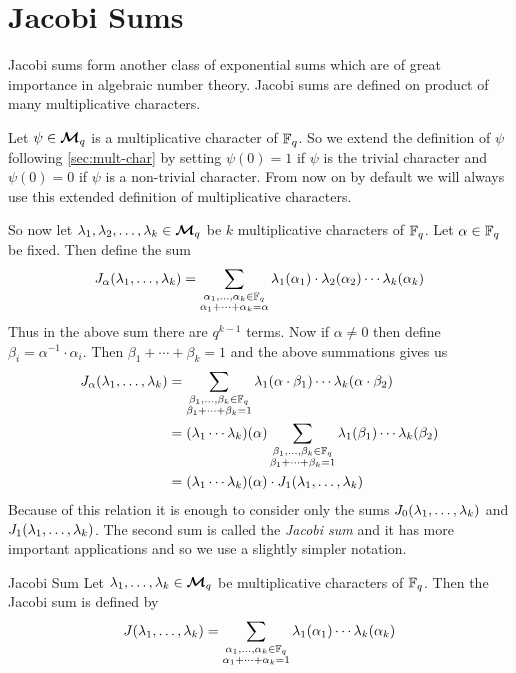 \section{Jacobi Sums}\label{sec:jacobi-sums}
%
Jacobi sums form another class of exponential sums which are of great importance in algebraic number theory. Jacobi sums are defined on product of many multiplicative characters. 

Let $\psi\in\boldsymbol{\mathcal{M}}_q$ is a multiplicative character of $\mathbb{F}_q$. So we extend the definition of $\psi$ following \autoref{sec:mult-char} by setting $\psi(0)=1$ if $\psi$ is the trivial character and $\psi(0)=0$ if $\psi$ is a non-trivial character. From now on by default we will always use this extended definition of multiplicative characters. 

So now let $\lambda_1,\lambda_2,\dots, \lambda_k\in\boldsymbol{\mathcal{M}}_q$ be $k$ multiplicative characters of $\mathbb{F}_q$. Let $\alpha\in \mathbb{F}_q$ be fixed. Then define the sum $$J_{\alpha}(\lambda_1,\dots, \lambda_k)=\sum_{\substack{\alpha_1,\dots,\alpha_k\in\mathbb{F}_q\\ \alpha_1+\cdots+\alpha_k=\alpha}}\lambda_1(\alpha_1)\cdot \lambda_2(\alpha_2)\cdots\lambda_k(\alpha_k)$$Thus in the above sum there are $q^{k-1}$ terms. Now if $\alpha\neq 0$ then define $\beta_i=\alpha^{-1}\cdot \alpha_i$. Then $\beta_1+\cdots+\beta_k=1$ and the above summations gives us \begin{align*}
  J_{\alpha}(\lambda_1,\dots, \lambda_k) & = \sum_{\substack{\beta_1,\dots,\beta_k\in\mathbb{F}_q\\ \beta_1+\cdots+\beta_k=1}}\lambda_1(\alpha\cdot \beta_1)\cdots\lambda_k(\alpha\cdot \beta_2)\\ 
  & = (\lambda_1\cdots\lambda_k)(\alpha)\sum_{\substack{\beta_1,\dots,\beta_k\in\mathbb{F}_q\\ \beta_1+\cdots+\beta_k=1}}\lambda_1(\beta_1)\cdots\lambda_k(\beta_2)\\ 
  & = (\lambda_1\cdots\lambda_k)(\alpha)\cdot J_1(\lambda_1,\dots, \lambda_k)
\end{align*}
Because of this relation it is enough to consider only the sums $J_0(\lambda_1,\dots, \lambda_k)$ and $J_1(\lambda_1,\dots, \lambda_k)$. The second sum is called the \emph{Jacobi sum} and it has more important applications and so we use a slightly simpler notation. 
\begin{Definition}{Jacobi Sum}{}
  Let $\lambda_1,\dots, \lambda_k\in\boldsymbol{\mathcal{M}}_q$ be multiplicative characters of $\mathbb{F}_q$. Then the Jacobi sum is defined by $$J(\lambda_1,\dots, \lambda_k)=\sum_{\substack{\alpha_1,\dots,\alpha_k\in\mathbb{F}_q\\ \alpha_1+\cdots+\alpha_k=1}}\lambda_1(\alpha_1)\cdots\lambda_k(\alpha_k)$$
\end{Definition} 

